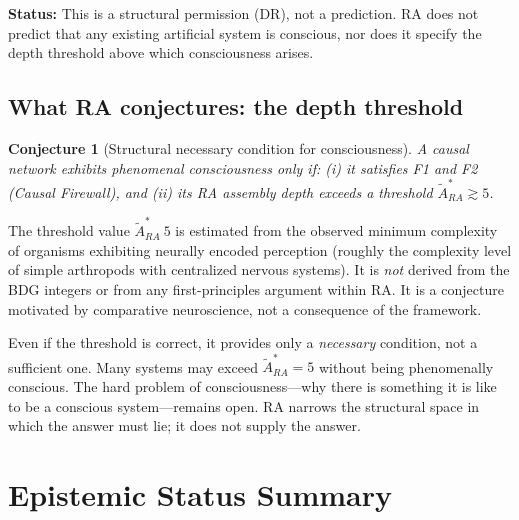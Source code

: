 \documentclass[11pt]{article}
\def\mathrm#1{#1}%
\def\approx{~}%
\newtheorem{conjecture}{Conjecture}
\begin{document}
\textbf{Status:} This is a structural permission (DR), not a prediction. RA does not predict that any existing artificial system is conscious, nor does it specify the depth threshold above which consciousness arises.

\subsection{What RA conjectures: the depth threshold}

\begin{conjecture}[Structural necessary condition for consciousness]
\label{conj:consciousness}
A causal network exhibits phenomenal consciousness only if: (i) it satisfies F1 and F2 (Causal Firewall), and (ii) its RA assembly depth exceeds a threshold $\tilde{A}_{\mathrm{RA}}^* \gtrsim 5$.
\end{conjecture}

The threshold value $\tilde{A}_{\mathrm{RA}}^* \approx 5$ is estimated from the observed minimum complexity of organisms exhibiting neurally encoded perception (roughly the complexity level of simple arthropods with centralized nervous systems). It is \emph{not} derived from the BDG integers or from any first-principles argument within RA. It is a conjecture motivated by comparative neuroscience, not a consequence of the framework.

Even if the threshold is correct, it provides only a \emph{necessary} condition, not a sufficient one. Many systems may exceed $\tilde{A}_{\mathrm{RA}}^* = 5$ without being phenomenally conscious. The hard problem of consciousness---why there is something it is like to be a conscious system---remains open. RA narrows the structural space in which the answer must lie; it does not supply the answer.

\section{Epistemic Status Summary}
\label{sec:status}
\end{document}
